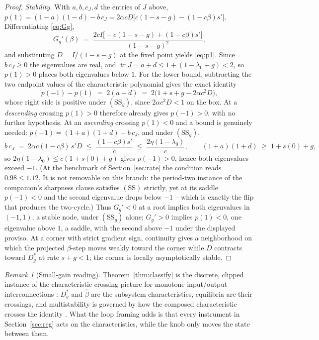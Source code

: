 \documentclass[11pt]{article}
\theoremstyle{definition}
\theoremstyle{remark}
\newtheorem{remark}[theorem]{Remark}
\numberwithin{equation}{section}
\begin{document}
\begin{proof}
\emph{Stability.} With $a,b,c_J,d$ the entries of $J$ above, $p(1)=(1-a)(1-d)-b\,c_J = 2\alpha c D\bigl[c(1-s-g)-(1-c\beta)s'\bigr]$. Differentiating \eqref{eq:Gg},
\[
G_g'(\beta) \;=\; \frac{2cI\bigl[-c(1-s-g)+(1-c\beta)s'\bigr]}{(1-s-g)^2},
\]
and substituting $D=I/(1-s-g)$ at the fixed point yields \eqref{eq:p1}. Since $b\,c_J\ge0$ the eigenvalues are real, and $\operatorname{tr}J = a+d \le 1+(1-\lambda_0+g) < 2$, so $p(1)>0$ places both eigenvalues below $1$. For the lower bound, subtracting the two endpoint values of the characteristic polynomial gives the exact identity
\[
p(-1)-p(1) \;=\; 2(a+d) \;=\; 2\bigl(1+s+g-2\alpha c^2 D\bigr),
\]
whose right side is positive under $(\mathrm{SS}_g)$, since $2\alpha c^2D<1$ on the box. At a \emph{descending} crossing $p(1)>0$ therefore already gives $p(-1)>0$, with no further hypothesis. At an \emph{ascending} crossing $p(1)<0$ and a bound is genuinely needed: $p(-1)=(1+a)(1+d)-b\,c_J$, and under $(\mathrm{SS}_g)$,
\[
b\,c_J \;=\; 2\alpha c(1-c\beta)\,s' D \;\le\; \frac{(1-c\beta)s'}{c} \;\le\; \frac{2\eta(1-\lambda_0)}{c},
\qquad
(1+a)(1+d) \;\ge\; 1+s(0)+g,
\]
so $2\eta(1-\lambda_0)\le c(1+s(0)+g)$ gives $p(-1)>0$, hence both eigenvalues exceed $-1$. (At the benchmark of Section~\ref{sec:rate} the condition reads $0.98\le 1.12$. It is not removable on this branch: the period-two instance of the companion's sharpness clause \citep{hofheinz2026drift} satisfies $(\mathrm{SS})$ strictly, yet at its saddle $p(-1)<0$ and the second eigenvalue drops below $-1$ -- which is exactly the flip that produces the two-cycle.) Thus $G_g'<0$ at a root implies both eigenvalues in $(-1,1)$, a stable node, under $(\mathrm{SS}_g)$ alone; $G_g'>0$ implies $p(1)<0$, one eigenvalue above $1$, a saddle, with the second above $-1$ under the displayed proviso. At a corner with strict gradient sign, continuity gives a neighborhood on which the projected $\beta$-step moves weakly toward the corner while $D$ contracts toward $D^\ast_g$ at rate $s+g<1$; the corner is locally asymptotically stable.
\end{proof}

\begin{remark}[Small-gain reading]\label{rem:smallgain}
Theorem~\ref{thm:classify} is the discrete, clipped instance of the characteristic-crossing picture for monotone input/output interconnections \citep{angeli2003monotone}: $D^\ast_g$ and $\hat\beta$ are the subsystem characteristics, equilibria are their crossings, and multistability is governed by how the composed characteristic crosses the identity \citep{angeli2004multi}. What the loop framing adds is that every instrument in Section~\ref{sec:reg} acts on the characteristics, while the knob only moves the state between them.
\end{remark}
\end{document}
